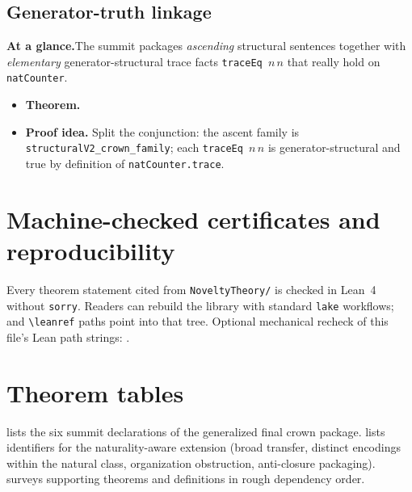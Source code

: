 \documentclass[11pt,a4paper]{article}
\newenvironment{witnessmeta}{%
  \par\smallskip
  \begin{tcolorbox}[
    enhanced, breakable=false,
    colback=gray!7, colframe=gray!55, boxrule=0.45pt, arc=2pt,
    left=8pt, right=8pt, top=5pt, bottom=5pt,
    before skip=0.25\baselineskip, after skip=0.4\baselineskip,
    fontupper=\small
  ]
}{\end{tcolorbox}}
\theoremstyle{definition}
\begin{document}
\subsection{Generator-truth linkage}

\begin{witnessmeta}
\textbf{At a glance.}\quad The summit packages \emph{ascending} structural sentences together with \emph{elementary} generator-structural trace facts \texttt{traceEq $n\,n$} that really hold on \texttt{natCounter}.
\end{witnessmeta}

\begin{itemize}[leftmargin=1.6em, itemsep=0.3em]
\item \textbf{Theorem.} 
\item \textbf{Proof idea.} Split the conjunction: the ascent family is \texttt{structuralV2\_crown\_family}; each \texttt{traceEq $n\,n$} is generator-structural and true by definition of \texttt{natCounter.trace}.
\end{itemize}


\section{Machine-checked certificates and reproducibility}

Every theorem statement cited from \texttt{NoveltyTheory/} is checked in Lean~4 without \texttt{sorry}. Readers can rebuild the library with standard \texttt{lake} workflows;  and \verb|\leanref| paths point into that tree. Optional mechanical recheck of this file's Lean path strings: .

\section{Theorem tables}

 lists the six summit declarations of the generalized final crown package.  lists identifiers for the naturality-aware extension (broad transfer, distinct encodings within the natural class, organization obstruction, anti-closure packaging).  surveys supporting theorems and definitions in rough dependency order.
\end{document}
